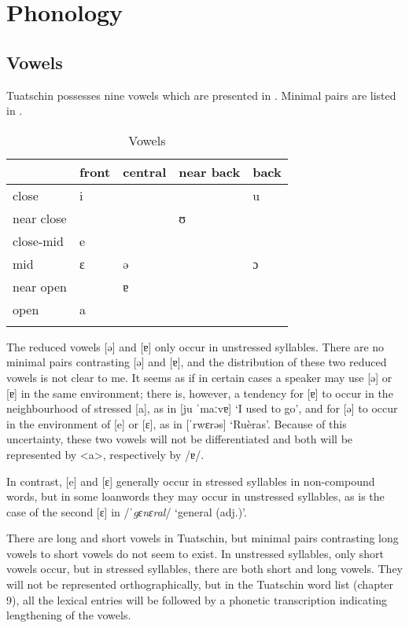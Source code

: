 \chapter{Phonology}

\section{Vowels}
Tuatschin possesses nine vowels which are presented in . Minimal pairs are listed in .
\begin{table}
\caption{Vowels}
\label{vow}
 \begin{tabular}{lllll}
  \lsptoprule
            &  front& central  & near back & back \\
  \midrule
 close   &  i  &      &   &    u \\
 near close    &   &      & ʊ  &  \\
close-mid    &  e  &   &  &       \\
mid    & ɛ   & ə  &        & ɔ \\
near open    &    &  ɐ   &        \\
open    &   a  & \\
  \lspbottomrule
 \end{tabular}
\end{table}

The reduced vowels [ə] and [ɐ] only occur in unstressed syllables. There are no minimal pairs contrasting [ə] and [ɐ], and the distribution of these two reduced vowels is not clear to me. It seems as if in certain cases a speaker may use [ə] or [ɐ] in the same environment; there is, however, a tendency for [ɐ] to occur in the neighbourhood of stressed [a], as in [ju ˈmaːvɐ] `I used to go', and for [ə] to occur in the environment of [e] or [ɛ], as in [ˈrwɛrəs] `Ruèras'. Because of this uncertainty, these two vowels will not be differentiated and both will be represented by <a>, respectively by /ɐ/.

In contrast, [e] and [ɛ] generally occur in stressed syllables in non-compound words, but in some loanwords they may occur in unstressed syllables, as is the case of the second [ɛ] in /\textit{ˈgɛnɛral}/ `general (adj.)'.

There are long and short vowels in Tuatschin, but minimal pairs contrasting long vowels to short vowels do not seem to exist. In unstressed syllables, only short vowels occur, but in stressed syllables, there are both short and long vowels. They will not be represented orthographically, but in the Tuatschin word list (chapter 9), all the lexical entries will be followed by a phonetic transcription indicating lengthening of the vowels.

